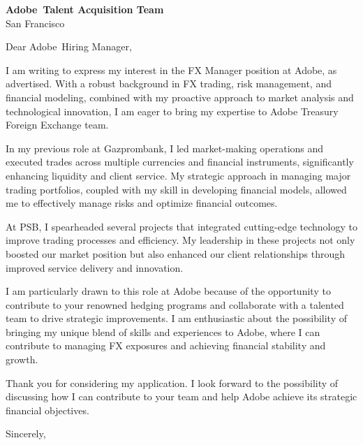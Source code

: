 \documentclass{letter}
\newcommand{\company}{Adobe}
\begin{document}
\begin{letter}{\textbf{\company\ Talent Acquisition Team} \\                
    San Francisco }

\opening{Dear \company\ Hiring Manager,}

I am writing to express my interest in the FX Manager position at Adobe, as advertised. With a robust background in FX trading, risk management, and financial modeling, combined with my proactive approach to market analysis and technological innovation, I am eager to bring my expertise to Adobe Treasury Foreign Exchange team.

In my previous role at Gazprombank, I led market-making operations and executed trades across multiple currencies and financial instruments, significantly enhancing liquidity and client service. My strategic approach in managing major trading portfolios, coupled with my skill in developing financial models, allowed me to effectively manage risks and optimize financial outcomes. 

At PSB, I spearheaded several projects that integrated cutting-edge technology to improve trading processes and efficiency. My leadership in these projects not only boosted our market position but also enhanced our client relationships through improved service delivery and innovation.

I am particularly drawn to this role at Adobe because of the opportunity to contribute to your renowned hedging programs and collaborate with a talented team to drive strategic improvements. I am enthusiastic about the possibility of bringing my unique blend of skills and experiences to Adobe, where I can contribute to managing FX exposures and achieving financial stability and growth.

Thank you for considering my application. I look forward to the possibility of discussing how I can contribute to your team and help Adobe achieve its strategic financial objectives.



\closing{Sincerely,}

\end{letter}
\end{document}

